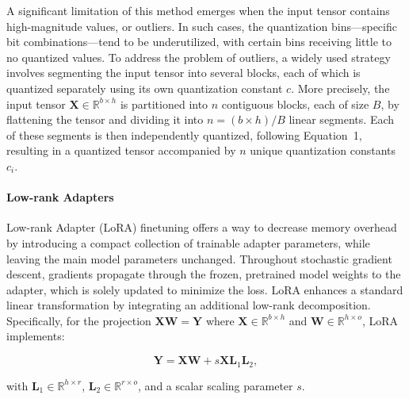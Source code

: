A significant limitation of this method emerges when the input tensor contains high-magnitude values, or outliers. In such cases, the quantization bins—specific bit combinations—tend to be underutilized, with certain bins receiving little to no quantized values. To address the problem of outliers, a widely used strategy involves segmenting the input tensor into several blocks, each of which is quantized separately using its own quantization constant $c$. More precisely, the input tensor $\mathbf{X}\in \mathbb{R}^{b\times h}$ is partitioned into $n$ contiguous blocks, each of size $B$, by flattening the tensor and dividing it into ${n = ({b\times h})/{B}}$ linear segments. Each of these segments is then independently quantized, following Equation~1, resulting in a quantized tensor accompanied by $n$ unique quantization constants $c_i$.

\paragraph{Low-rank Adapters} Low-rank Adapter (LoRA) finetuning \citep{hu2021lora} offers a way to decrease memory overhead by introducing a compact collection of trainable adapter parameters, while leaving the main model parameters unchanged. Throughout stochastic gradient descent, gradients propagate through the frozen, pretrained model weights to the adapter, which is solely updated to minimize the loss. LoRA enhances a standard linear transformation by integrating an additional low-rank decomposition. Specifically, for the projection ${\mathbf{X}\mathbf{W} = \mathbf{Y}}$ where $\mathbf{X}\in \mathbb{R}^{b\times h}$ and $\mathbf{W}\in \mathbb{R}^{h\times o}$, LoRA implements:

\begin{equation}
    \mathbf{Y} = \mathbf{X}\mathbf{W} + s\mathbf{X}\mathbf{L}_1\mathbf{L}_2,
\end{equation}

with $\mathbf{L}_1\in \mathbb{R}^{h\times r}$, $\mathbf{L}_2\in \mathbb{R}^{r\times o}$, and a scalar scaling parameter $s$.

